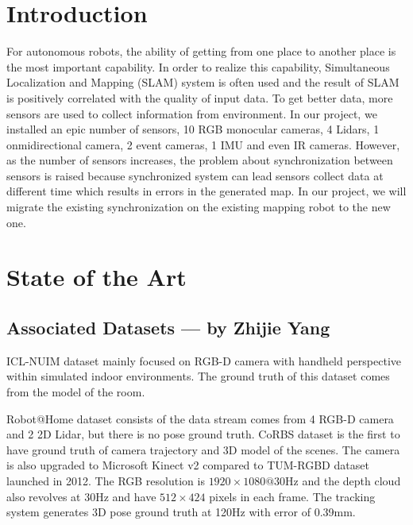 \documentclass[conference]{IEEEtran}
\begin{document}
	\section{Introduction}
	For autonomous robots, the ability of getting from one place to another place is the most important capability. In order to realize this capability, Simultaneous Localization and Mapping (SLAM) system is often used and the result of SLAM is positively correlated with the quality of input data. To get better data, more sensors are used to collect information from environment. In our project, we installed an epic number of sensors, 10 RGB monocular cameras, 4 Lidars, 1 onmidirectional camera, 2 event cameras, 1 IMU and even IR cameras. However, as the number of sensors increases, the problem about synchronization between sensors is raised because synchronized system can lead sensors collect data at different time which results in errors in the generated map. In our project, we will migrate the existing synchronization on the existing mapping robot to the new one.
	
	\section{State of the Art}
	
	\subsection{Associated Datasets --- by Zhijie Yang}
	ICL-NUIM dataset \cite{ICL-NUIM} mainly focused on RGB-D camera with handheld perspective within simulated indoor environments. The ground truth of this dataset comes from the model of the room. 
	
	Robot@Home dataset \cite{Robot@Home} consists of the data stream comes from 4 RGB-D camera and 2 2D Lidar, but there is no pose ground truth. %
	CoRBS dataset\cite{CoRBS} is the first to have ground truth of camera trajectory and 3D model of the scenes. The camera is also upgraded to Microsoft Kinect v2 compared to TUM-RGBD dataset launched in 2012. The RGB resolution is $1920\times 1080@$30Hz and the depth cloud also revolves at 30Hz and have $512\times 424$ pixels in each frame. The tracking system generates 3D pose ground truth at 120Hz with error of 0.39mm.
	
\end{document}
